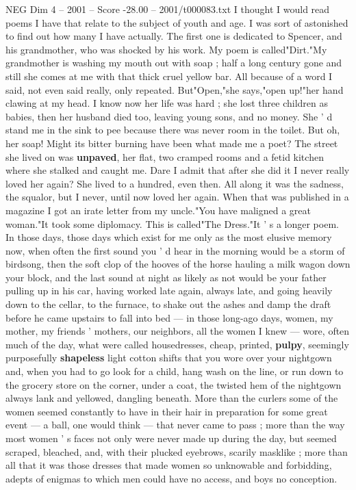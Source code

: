 \begin{textsample}{NEG Dim 4 – 2001 – Score -28.00 – 2001/t000083.txt}  \label{ex:f4_neg_001}
I thought I would read poems I have that relate to the subject of youth and age.
I was sort of astonished to find out how many I have actually.
The first one is dedicated to Spencer, and his grandmother, who was shocked by his work.
My poem is called"Dirt."My grandmother is washing my mouth out with soap ; half a long century gone and still she comes at me with that thick cruel yellow bar.
All because of a word I said, not even said really, only repeated.
But"Open,"she says,"open up!"her hand clawing at my head.
I know now her life was hard ; she lost three children as babies, then her husband died too, leaving young sons, and no money.
She ' d stand me in the sink to pee because there was never room in the toilet.
But oh, her soap!
Might its bitter burning have been what made me a poet?
The street she lived on was \textbf{unpaved}, her flat, two cramped rooms and a fetid kitchen where she stalked and caught me.
Dare I admit that after she did it I never really loved her again?
She lived to a hundred, even then.
All along it was the sadness, the squalor, but I never, until now loved her again.
When that was published in a magazine I got an irate letter from my uncle."You have maligned a great woman."It took some diplomacy.
This is called"The Dress."It ' s a longer poem.
In those days, those days which exist for me only as the most elusive memory now, when often the first sound you ' d hear in the morning would be a storm of birdsong, then the soft clop of the hooves of the horse hauling a milk wagon down your block, and the last sound at night as likely as not would be your father pulling up in his car, having worked late again, always late, and going heavily down to the cellar, to the furnace, to shake out the ashes and damp the draft before he came upstairs to fall into bed — in those long-ago days, women, my mother, my friends ' mothers, our neighbors, all the women I knew — wore, often much of the day, what were called housedresses, cheap, printed, \textbf{pulpy}, seemingly purposefully \textbf{shapeless} light cotton shifts that you wore over your nightgown and, when you had to go look for a child, hang wash on the line, or run down to the grocery store on the corner, under a coat, the twisted hem of the nightgown always lank and yellowed, dangling beneath.
More than the curlers some of the women seemed constantly to have in their hair in preparation for some great event — a ball, one would think — that never came to pass ; more than the way most women ' s faces not only were never made up during the day, but seemed scraped, bleached, and, with their plucked eyebrows, scarily masklike ; more than all that it was those dresses that made women so unknowable and forbidding, adepts of enigmas to which men could have no access, and boys no conception.

\end{textsample}
